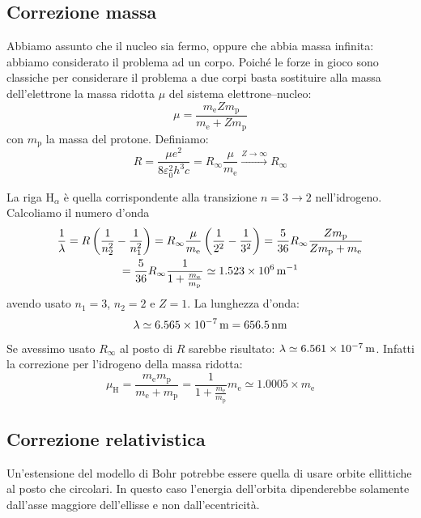 \subsection{Correzione massa}
Abbiamo assunto che il nucleo sia fermo, oppure che abbia massa infinita: abbiamo considerato il problema ad un corpo. Poiché le forze in gioco sono classiche per considerare il problema a due corpi basta sostituire alla massa dell'elettrone la massa ridotta $\mu$ del sistema elettrone--nucleo:
\begin{equation}
	\mu=\frac{m_\mathrm{e}Zm_\mathrm{p}}{m_\mathrm{e}+Zm_\mathrm{p}}
\end{equation}
con $m_\mathrm{p}$ la massa del protone. Definiamo:
\begin{equation}
	R=\frac{\mu e^2}{8\varepsilon_0^2h^3 c}=R_\infty\frac{\mu}{m_\mathrm{e}}\xrightarrow{Z\to\infty} R_\infty
\end{equation}
\begin{Es}
	La riga $\mathrm{H}_\alpha$ è quella corrispondente alla transizione $n=3\to2$ nell'idrogeno. Calcoliamo il numero d'onda
	\begin{multline*}
		\frac{1}{\lambda}=R\left(\frac{1}{n_2^2}-\frac{1}{n_1^2}\right)=R_\infty\frac{\mu}{m_\mathrm{e}}\left(\frac{1}{2^2}-\frac{1}{3^2}\right)=\frac{5}{36}R_\infty\frac{Zm_\mathrm{p}}{Z m_\mathrm{p}+m_\mathrm{e}}\\=\frac{5}{36}R_\infty\frac{1}{1+\frac{m_\mathrm{e}}{m_\mathrm{p}}}\simeq \SI{1.523E6}{\per\meter}
	\end{multline*}
	avendo usato $n_1=3$, $n_2=2$ e $Z=1$. La lunghezza d'onda:
	\[
		\lambda\simeq \SI{6.565E-7}{\meter}=\SI{656.5}{\nano\meter}
	\]
	Se avessimo usato $R_\infty$ al posto di $R$ sarebbe risultato: $\lambda\simeq \SI{6.561E-7}{\meter}$. Infatti la correzione per l'idrogeno della massa ridotta:
	\[
		\mu_\mathrm{H}=\frac{m_\mathrm{e}m_\mathrm{p}}{m_\mathrm{e}+m_\mathrm{p}}=\frac{1}{1+\frac{m_\mathrm{e}}{m_\mathrm{p}}}m_\mathrm{e}\simeq 1.0005 \times m_\mathrm{e}
	\]
\end{Es}
\subsection{Correzione relativistica}
Un'estensione del modello di Bohr potrebbe essere quella di usare orbite ellittiche al posto che circolari. In questo caso l'energia dell'orbita dipenderebbe solamente dall'asse maggiore dell'ellisse e non dall'ecentricità.

